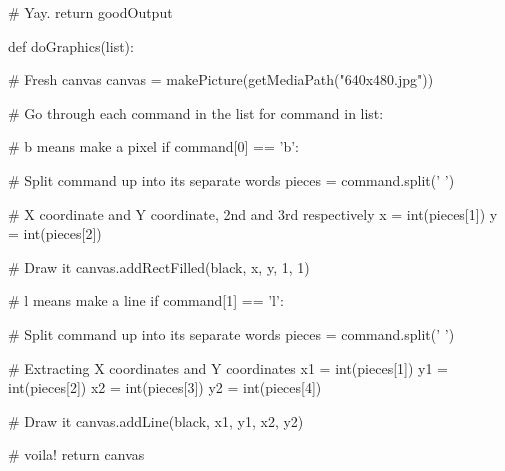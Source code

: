 \begin{exercises}
\begin{ex}
\begin{example}
  # Yay.
  return goodOutput
\end{example}
\end{ex}

\begin{ex} %
\begin{example}
def doGraphics(list):

    # Fresh canvas
    canvas = makePicture(getMediaPath("640x480.jpg"))

    # Go through each command in the list
    for command in list:
  
        # b means make a pixel
        if command[0] == 'b':
    
            # Split command up into its separate words
            pieces = command.split(' ')
      
            # X coordinate and Y coordinate, 2nd and 3rd respectively
            x = int(pieces[1])
            y = int(pieces[2])
      
            # Draw it
            canvas.addRectFilled(black, x, y, 1, 1)
    
        # l means make a line
        if command[1] == 'l':
    
            # Split command up into its separate words
            pieces = command.split(' ')
      
            # Extracting X coordinates and Y coordinates
            x1 = int(pieces[1])
            y1 = int(pieces[2])
            x2 = int(pieces[3])
            y2 = int(pieces[4])
      
            # Draw it
            canvas.addLine(black, x1, y1, x2, y2)
  
    # voila!
    return canvas
\end{example}
\end{ex}

\end{exercises}
